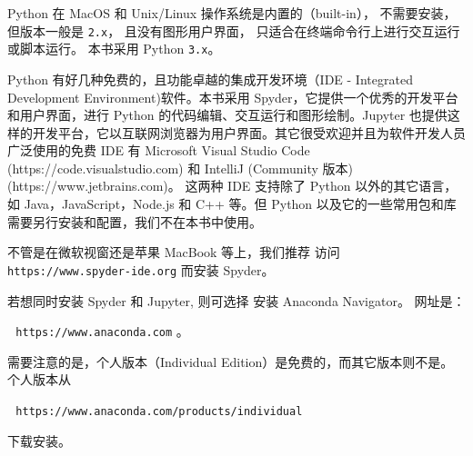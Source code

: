 \documentclass[main.tex]{subfiles}
\begin{document}
Python 在 MacOS 和 Unix/Linux 操作系统是内置的（built-in），
不需要安装，但版本一般是 \texttt{2.x}，
且没有图形用户界面，
只适合在终端命令行上进行交互运行或脚本运行。
本书采用 Python \texttt{3.x}。

Python 有好几种免费的，且功能卓越的集成开发环境（IDE - Integrated Development Environment)软件。本书采用 Spyder，它提供一个优秀的开发平台和用户界面，进行 Python 的代码编辑、交互运行和图形绘制。Jupyter 也提供这样的开发平台，它以互联网浏览器为用户界面。其它很受欢迎并且为软件开发人员广泛使用的免费 IDE 有 Microsoft Visual Studio Code (https://code.visualstudio.com) 和 IntelliJ (Community 版本) (https://www.jetbrains.com)。
这两种 IDE 支持除了 Python 以外的其它语言，如 Java，JavaScript，Node.js 和 C++ 等。但 Python 以及它的一些常用包和库需要另行安装和配置，我们不在本书中使用。  


不管是在微软视窗还是苹果 MacBook 等上，我们推荐
	访问
\texttt{https://www.spyder-ide.org} 而安装 Spyder。

若想同时安装 Spyder 和 Jupyter, 则可选择 
安装 Anaconda Navigator。 网址是：

\,\,\,\,\texttt{https://www.anaconda.com} 。

\noindent 需要注意的是，个人版本（Individual Edition）是免费的，而其它版本则不是。个人版本从

\,\,\,\,\texttt{https://www.anaconda.com/products/individual} 

\noindent 下载安装。
\end{document}
